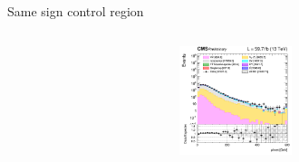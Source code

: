 \documentclass[8pt]{beamer}
\begin{document}
\begin{frame}{Same sign control region}
\begin{columns}
		\begin{column}{0.33\textwidth}
			\begin{center}
     			\includegraphics[width=1.0\textwidth, height=90pt]{figs/2018/log_cratio_SSCR_ll_METcorrected_pt.png}
    		\end{center}		
		\end{column}
\end{columns} \vfill
\end{frame}
\end{document}
